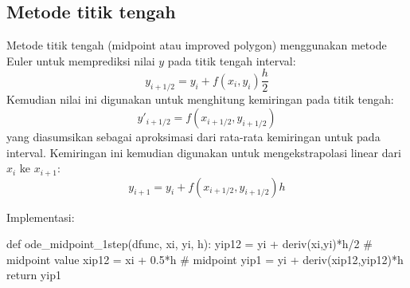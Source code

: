 \subsection{Metode titik tengah}

Metode titik tengah (midpoint atau improved polygon)
menggunakan metode Euler untuk memprediksi nilai $y$ pada titik tengah
interval:
\begin{equation*}
y_{i+1/2} = y_{i} + f(x_i, y_i) \frac{h}{2}
\end{equation*}
Kemudian nilai ini digunakan untuk menghitung kemiringan pada titik tengah:
\begin{equation*}
y'_{i+1/2} = f(x_{i+1/2}, y_{i+1/2})
\end{equation*}
yang diasumsikan sebagai aproksimasi dari rata-rata kemiringan untuk pada interval.
Kemiringan ini kemudian digunakan untuk mengekstrapolasi linear dari $x_i$ ke $x_{i+1}$:
\begin{equation}
y_{i+1} = y_{i} + f(x_{i+1/2}, y_{i+1/2}) h
\end{equation}

Implementasi:
\begin{pythoncode}
def ode_midpoint_1step(dfunc, xi, yi, h):
    yip12 = yi + deriv(xi,yi)*h/2  # midpoint value
    xip12 = xi + 0.5*h             # midpoint
    yip1 = yi + deriv(xip12,yip12)*h
    return yip1
\end{pythoncode}